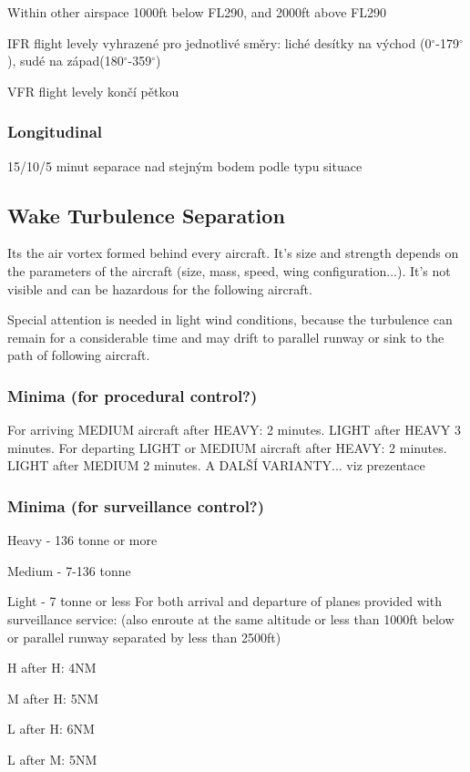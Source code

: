Within other airspace
1000ft below FL290, and
2000ft above FL290

IFR flight levely vyhrazené pro jednotlivé směry: liché desítky na východ (0$^{\circ}$-179$^{\circ}$), sudé na západ(180$^{\circ}$-359$^{\circ}$)

VFR flight levely končí pětkou

\subsubsection{Longitudinal}
15/10/5 minut separace nad stejným bodem podle typu situace 
\cite[Chapter 5.4.2.2]{doc4444}

\subsection{Wake Turbulence Separation}
Its the air vortex formed behind every aircraft. It's size and strength depends on the parameters of the aircraft (size, mass, speed, wing configuration...). It's not visible and can be hazardous for the following aircraft.

Special attention is needed in light wind conditions, because the turbulence can remain for a considerable time and may drift to parallel runway or sink to the path of following aircraft.

\subsubsection{Minima (for procedural control?)}
For arriving MEDIUM aircraft after HEAVY: 2 minutes. LIGHT after HEAVY 3 minutes. \cite[Chapter 5.8.2]{doc4444}
For departing LIGHT or MEDIUM aircraft after HEAVY: 2 minutes. LIGHT after MEDIUM 2 minutes. \cite[Chapter 5.8.3]{doc4444}
A DALŠÍ VARIANTY... viz prezentace

\subsubsection{Minima (for surveillance control?)}
\bitem
\item Heavy - 136 tonne or more
\item Medium - 7-136 tonne
\item Light - 7 tonne or less
\eitem
For both arrival and departure of planes provided with surveillance service: (also enroute at the same altitude or less than 1000ft below or parallel runway separated by less than 2500ft)
\bitem
\item H after H: 4NM
\item M after H: 5NM
\item L after H: 6NM
\item L after M: 5NM
\eitem
\cite[Chapter 8.7.3]{doc4444}


